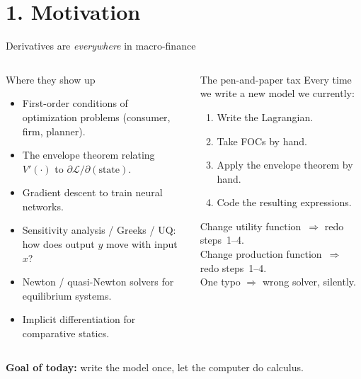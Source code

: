 \documentclass[aspectratio=169,11pt]{beamer}
\newcommand{\emphc}[1]{\textcolor{harvardcrimson}{#1}}
\begin{document}
\section*{1. Motivation}

\begin{frame}{Derivatives are \emph{everywhere} in macro-finance}
\begin{columns}[t]
\begin{block}{Where they show up}
\small
\begin{itemize}\itemsep3pt
  \item \emphc{First-order conditions} of optimization problems (consumer, firm, planner).
  \item The \emphc{envelope theorem} relating $V'(\cdot)$ to $\partial \mathcal{L}/\partial (\text{state})$.
  \item \emphc{Gradient descent} to train neural networks.
  \item \emphc{Sensitivity analysis / Greeks / UQ}: how does output $y$ move with input $x$?
  \item \emphc{Newton / quasi-Newton} solvers for equilibrium systems.
  \item \emphc{Implicit differentiation} for comparative statics.
\end{itemize}
\end{block}

\begin{alertblock}{The pen-and-paper tax}
\small
Every time we write a new model we currently:
\begin{enumerate}\itemsep2pt
  \item Write the Lagrangian.
  \item Take FOCs by hand.
  \item Apply the envelope theorem by hand.
  \item Code the resulting expressions.
\end{enumerate}
Change utility function~$\Rightarrow$ redo steps~1--4.\\
Change production function~$\Rightarrow$ redo steps~1--4.\\
One typo $\Rightarrow$ wrong solver, silently.
\end{alertblock}
\end{columns}
\vspace{4pt}
\centerline{\emphc{\textbf{Goal of today:}} write the model once, let the computer do calculus.}
\end{frame}
\end{document}

